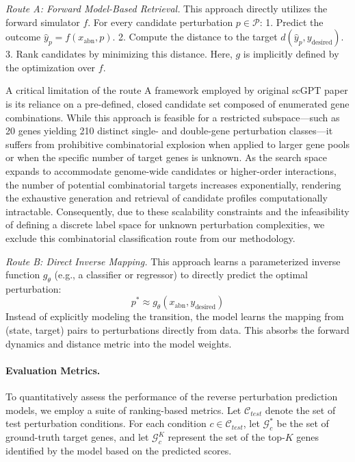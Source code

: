 \documentclass[conference]{IEEEtran}
\begin{document}
\textit{Route A: Forward Model-Based Retrieval.}
This approach directly utilizes the forward simulator $f$. For every candidate perturbation $p \in \mathcal{P}$:
1. Predict the outcome $\hat{y}_p = f(x_{\text{abn}}, p)$.
2. Compute the distance to the target $d(\hat{y}_p, y_{\text{desired}})$.
3. Rank candidates by minimizing this distance. Here, $g$ is implicitly defined by the optimization over $f$.

A critical limitation of the route A framework employed by original scGPT paper is its reliance on a pre-defined, closed candidate set composed of enumerated gene combinations. While this approach is feasible for a restricted subspace---such as 20 genes yielding 210 distinct single- and double-gene perturbation classes---it suffers from prohibitive combinatorial explosion when applied to larger gene pools or when the specific number of target genes is unknown. As the search space expands to accommodate genome-wide candidates or higher-order interactions, the number of potential combinatorial targets increases exponentially, rendering the exhaustive generation and retrieval of candidate profiles computationally intractable. Consequently, due to these scalability constraints and the infeasibility of defining a discrete label space for unknown perturbation complexities, we exclude this combinatorial classification route from our methodology.


\textit{Route B: Direct Inverse Mapping.}
This approach learns a parameterized inverse function $g_\theta$ (e.g., a classifier or regressor) to directly predict the optimal perturbation:
\[
p^* \approx g_\theta(x_{\text{abn}}, y_{\text{desired}})
\]
Instead of explicitly modeling the transition, the model learns the mapping from (state, target) pairs to perturbations directly from data. This absorbs the forward dynamics and distance metric into the model weights.

\paragraph{Evaluation Metrics.}
To quantitatively assess the performance of the reverse perturbation prediction models, we employ a suite of ranking-based metrics. Let $\mathcal{C}_{test}$ denote the set of test perturbation conditions. For each condition $c \in \mathcal{C}_{test}$, let $\mathcal{G}_c^*$ be the set of ground-truth target genes, and let $\mathcal{G}_c^K$ represent the set of the top-$K$ genes identified by the model based on the predicted scores.
\end{document}
